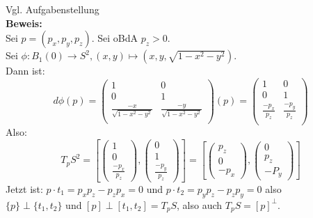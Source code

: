 \begin{problem*}[2b] Vgl. Aufgabenstellung \\
  \textbf{Beweis:} \\
  Sei \( p = (p_x, p_y, p_z) \). Sei oBdA \( p_z > 0 \). \\
  Sei \( \phi : B_1(0) \to S^2, (x,y) \mapsto (x,y,\sqrt{ 1- x^2-y^2}) \). \\
  Dann ist:
  \begin{equation*} 
    d \phi(p) = 
    \begin{pmatrix}
      1 & 0 \\
      0 & 1 \\
      \frac{-x}{\sqrt{ 1 - x^2 -y^2}} & \frac{-y}{\sqrt{ 1 - x^2 -y^2}} \\
    \end{pmatrix}(p) = 
    \begin{pmatrix}
      1 & 0 \\
      0 & 1 \\
      \frac{-p_x}{p_z} & \frac{-p_y}{p_z} \\
    \end{pmatrix} 
  \end{equation*}
  Also:
  \begin{equation*}
    {T_p S}^2 = \left[
    \begin{pmatrix}
      1 \\
      0 \\
      \frac{-p_x}{p_z}
    \end{pmatrix},
    \begin{pmatrix}
      0 \\
      1 \\
      \frac{-p_y}{p_z}
    \end{pmatrix}
    \right] = \left[
    \begin{pmatrix}
      p_z\\
      0 \\
      -p_x
    \end{pmatrix},
    \begin{pmatrix}
      0 \\
      p_z \\
      -P_y
    \end{pmatrix}
    \right]
  \end{equation*}
  Jetzt ist: \( p \cdot t_1 = p_x p_z - p_z p_x = 0 \) und \( p \cdot t_2 = p_y p_z - p_z p_y = 0 \) also \\
  \( \{ p \} \perp \{ t_1,t_2 \} \) und \( [p] \perp [t_1,t_2] = T_p S \), also auch \( T_p S = {[p]}^{\perp} \).
\end{problem*}

